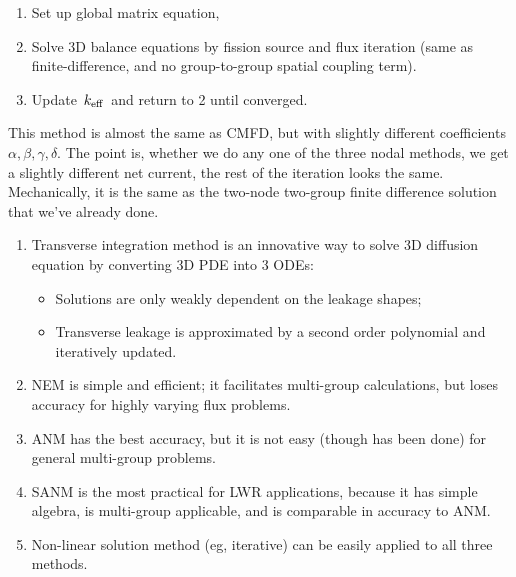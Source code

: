 \documentclass{school-22.211-notes}
\begin{document}
\begin{enumerate}
\item Set up global matrix equation,

\item Solve 3D balance equations by fission source and flux iteration (same as finite-difference, and no group-to-group spatial coupling term). 

\item Update $\left. k_{\mathrm{eff}} \right.$ and return to 2 until converged. 
\end{enumerate}
This method is almost the same as CMFD, but with slightly different coefficients $\alpha, \beta, \gamma, \delta$. The point is, whether we do any one of the three nodal methods, we get a slightly different net current, the rest of the iteration looks the same. Mechanically, it is the same as the two-node two-group finite difference solution that we've already done. 



\clearpage
{}
\begin{enumerate}
\item Transverse integration method is an innovative way to solve 3D diffusion equation by converting 3D PDE into 3 ODEs: 
  \begin{itemize}
    \item Solutions are only weakly dependent on the leakage shapes;
    \item Transverse leakage is approximated by a second order polynomial and iteratively updated.
  \end{itemize}

\item NEM is simple and efficient; it facilitates multi-group calculations, but loses accuracy for highly varying flux problems. 

\item ANM has the best accuracy, but it is not easy (though has been done) for general multi-group problems.

\item SANM is the most practical for LWR applications, because it has simple algebra, is multi-group applicable, and is comparable in accuracy to ANM. 

\item Non-linear solution method (eg, iterative) can be easily applied to all three methods. 
\end{enumerate}
\end{document}
